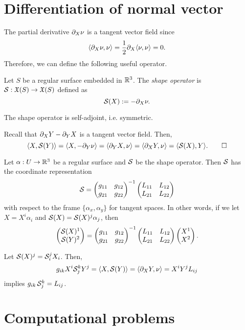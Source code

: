 \documentclass{../note}
\def\a{\alpha}
\begin{document}
\begin{prb}


\section{Differentiation of normal vector}

The partial derivative $\pd_X\nu$ is a tangent vector field since
\[\<\pd_X\nu,\nu\>=\frac12\pd_X\<\nu,\nu\>=0.\]
Therefore, we can define the following useful operator.
\begin{defn}
Let $S$ be a regular surface embedded in $\mathbb{R}^3$.
The \emph{shape operator} is $\mathcal{S}:\mathfrak{X}(S)\to\mathfrak{X}(S)$ defined as
\[\cS(X):=-\pd_X\nu.\]
\end{defn}
\begin{prop}
The shape operator is self-adjoint, i.e. symmetric.
\end{prop}
\begin{pf}
Recall that $\pd_XY-\pd_YX$ is a tangent vector field.
Then,
\[\<X,\cS(Y)\>=\<X,-\pd_Y\nu\>=\<\pd_YX,\nu\>=\<\pd_XY,\nu\>=\<\cS(X),Y\>.\qedhere\]
\end{pf}


\begin{thm}
Let $\a:U\to\R^3$ be a regular surface and $\mathcal{S}$ be the shape operator.
Then $\mathcal{S}$ has the coordinate representation
\[\mathcal{S}=\begin{pmatrix}g_{11}&g_{12}\\g_{21}&g_{22}\end{pmatrix}^{-1}\begin{pmatrix}L_{11}&L_{12}\\L_{21}&L_{22}\end{pmatrix}\]
with respect to the frame $\{\a_x,\a_y\}$ for tangent spaces.
In other words, if we let $X=X^i\a_i$ and $\cS(X)=\cS(X)^j\a_j$, then
\[\begin{pmatrix}\mathcal{S}(X)^1\\\mathcal{S}(Y)^2\end{pmatrix}=\begin{pmatrix}g_{11}&g_{12}\\g_{21}&g_{22}\end{pmatrix}^{-1}\begin{pmatrix}L_{11}&L_{12}\\L_{21}&L_{22}\end{pmatrix}\begin{pmatrix}X^1\\X^2\end{pmatrix}.\]
\end{thm}
\begin{pf}
Let $\mathcal{S}(X)^j=\mathcal{S}_i^jX_i$.
Then,
\[g_{ik}X^i\cS_j^kY^j=\<X,\cS(Y)\>=\<\pd_XY,\nu\>=X^iY^jL_{ij}\]
implies $g_{ik}\,\mathcal{S}_j^k=L_{ij}$.
\end{pf}






\section{Computational problems}


\end{prb}
\end{document}
